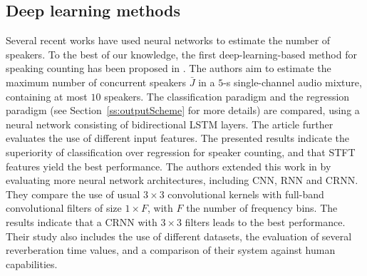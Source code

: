 \subsection{Deep learning methods}

Several recent works have used neural networks to estimate the number of speakers. To the best of our knowledge, the first deep-learning-based method for speaking counting has been proposed in \cite{stoter_classification_2018}. The authors aim to estimate the maximum number of concurrent speakers $\bar{J}$ in a $5$-s single-channel audio mixture, containing at most $10$ speakers. The classification paradigm and the regression paradigm (see Section~\ref{ss:outputScheme} for more details) are compared, using a neural network consisting of bidirectional LSTM layers. The article further evaluates the use of different input features. The presented results indicate the superiority of classification over regression for speaker counting, and that STFT features yield the best performance. The authors extended this work in \cite{stoter_countnet:_2019} by evaluating more neural network architectures, including CNN, RNN and CRNN. They compare the use of usual $3 \times 3$ convolutional kernels with full-band convolutional filters of size $1 \times F$, with $F$ the number of frequency bins. The results indicate that a CRNN with $3 \times 3$ filters leads to the best performance. Their study also includes the use of different datasets, the evaluation of several reverberation time values, and a comparison of their system against human capabilities. 

